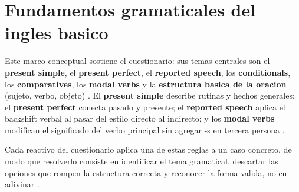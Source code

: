 \documentclass[
	spanish,
	letterpaper, oneside
]{article}
\begin{document}
%
%
\section{Fundamentos gramaticales del ingles basico}

Este marco conceptual sostiene el cuestionario: sus temas centrales son el \textbf{present simple}, el \textbf{present perfect}, el \textbf{reported speech}, los \textbf{conditionals}, los \textbf{comparatives}, los \textbf{modal verbs} y la \textbf{estructura basica de la oracion} (sujeto, verbo, objeto) \citep{murphy2019english,swan2016practical}. El \textbf{present simple} describe rutinas y hechos generales; el \textbf{present perfect} conecta pasado y presente; el \textbf{reported speech} aplica el backshift verbal al pasar del estilo directo al indirecto; y los \textbf{modal verbs} modifican el significado del verbo principal sin agregar -s en tercera persona \citep{eastwood2002oxford,azar2017understanding}.

Cada reactivo del cuestionario aplica una de estas reglas a un caso concreto, de modo que resolverlo consiste en identificar el tema gramatical, descartar las opciones que rompen la estructura correcta y reconocer la forma valida, no en adivinar \citep{unadm100TecnicasDidacticas2023}.

\end{document}
